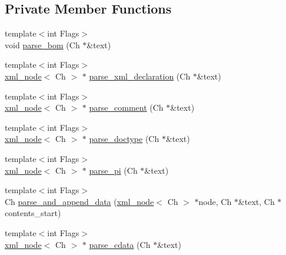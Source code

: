 \subsection*{Private Member Functions}
\begin{DoxyCompactItemize}
\item 
{\footnotesize template$<$int Flags$>$ }\\void \mbox{\hyperlink{classrapidxml_1_1xml__document_aaa63a0c7b57ab8fce63d4aebe4da123d}{parse\+\_\+bom}} (Ch $\ast$\&text)
\item 
{\footnotesize template$<$int Flags$>$ }\\\mbox{\hyperlink{classrapidxml_1_1xml__node}{xml\+\_\+node}}$<$ Ch $>$ $\ast$ \mbox{\hyperlink{classrapidxml_1_1xml__document_a0151c52c82ba79ea0605c2facf39c534}{parse\+\_\+xml\+\_\+declaration}} (Ch $\ast$\&text)
\item 
{\footnotesize template$<$int Flags$>$ }\\\mbox{\hyperlink{classrapidxml_1_1xml__node}{xml\+\_\+node}}$<$ Ch $>$ $\ast$ \mbox{\hyperlink{classrapidxml_1_1xml__document_abc287ce83bcb2dc8519e300236004591}{parse\+\_\+comment}} (Ch $\ast$\&text)
\item 
{\footnotesize template$<$int Flags$>$ }\\\mbox{\hyperlink{classrapidxml_1_1xml__node}{xml\+\_\+node}}$<$ Ch $>$ $\ast$ \mbox{\hyperlink{classrapidxml_1_1xml__document_a4c613f3a928f763b4c788422edda5860}{parse\+\_\+doctype}} (Ch $\ast$\&text)
\item 
{\footnotesize template$<$int Flags$>$ }\\\mbox{\hyperlink{classrapidxml_1_1xml__node}{xml\+\_\+node}}$<$ Ch $>$ $\ast$ \mbox{\hyperlink{classrapidxml_1_1xml__document_a09e12a4233a07387d4b5a5ad239388aa}{parse\+\_\+pi}} (Ch $\ast$\&text)
\item 
{\footnotesize template$<$int Flags$>$ }\\Ch \mbox{\hyperlink{classrapidxml_1_1xml__document_aec6cedf45179b6378c670bc3ea509e61}{parse\+\_\+and\+\_\+append\+\_\+data}} (\mbox{\hyperlink{classrapidxml_1_1xml__node}{xml\+\_\+node}}$<$ Ch $>$ $\ast$node, Ch $\ast$\&text, Ch $\ast$contents\+\_\+start)
\item 
{\footnotesize template$<$int Flags$>$ }\\\mbox{\hyperlink{classrapidxml_1_1xml__node}{xml\+\_\+node}}$<$ Ch $>$ $\ast$ \mbox{\hyperlink{classrapidxml_1_1xml__document_ab94daeb25e8a1609e31210a45b2afa6c}{parse\+\_\+cdata}} (Ch $\ast$\&text)
\item 

\end{DoxyCompactItemize}
